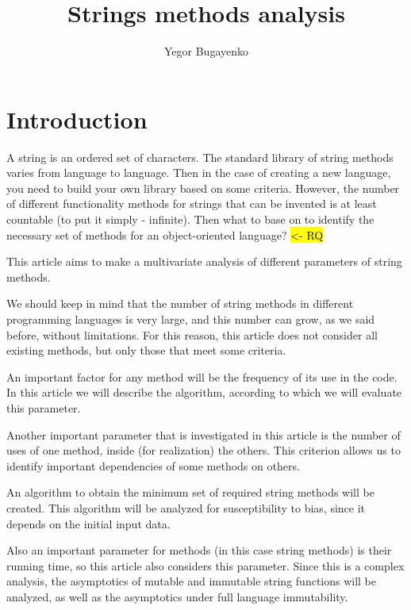 \documentclass[anonymous,sigplan,review,11pt,nonacm,natbib=false]{acmart}
\title{Strings methods analysis}
\author{Yegor Bugayenko}
\affiliation{Huawei\city{Moscow}\country{Russia}}
\begin{document}
    \raggedbottom

    \begin{abstract}
    \end{abstract}

    \maketitle

    \section{Introduction}\label{sec:intro}

    A string is an ordered set of characters. The standard library of string methods varies from language to language. Then in the case of creating a new language, you need to build your own library based on some criteria. However, the number of different functionality methods for strings that can be invented is at least countable (to put it simply - infinite). Then what to base on to identify the necessary set of methods for an object-oriented language? \hl{<- RQ}

    This article aims to make a multivariate analysis of different parameters of string methods.

    We should keep in mind that the number of string methods in different programming languages is very large, and this number can grow, as we said before, without limitations. For this reason, this article does not consider all existing methods, but only those that meet some criteria.

    An important factor for any method will be the frequency of its use in the code. In this article we will describe the algorithm, according to which we will evaluate this parameter.

    Another important parameter that is investigated in this article is the number of uses of one method, inside (for realization) the others. This criterion allows us to identify important dependencies of some methods on others.

    An algorithm to obtain the minimum set of required string methods will be created. This algorithm will be analyzed for susceptibility to bias, since it depends on the initial input data.

    Also an important parameter for methods (in this case string methods) is their running time, so this article also considers this parameter. Since this is a complex analysis, the asymptotics of mutable and immutable string functions will be analyzed, as well as the asymptotics under full language immutability.
\end{document}
